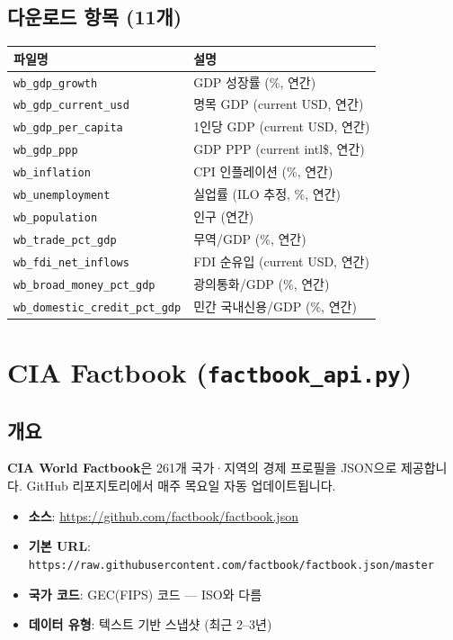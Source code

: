 \documentclass[11pt,a4paper]{article}
\newcommand{\code}[1]{\texttt{#1}}
\newcommand{\file}[1]{\texttt{\textcolor{string}{#1}}}
\begin{document}
\subsection{다운로드 항목 (11개)}

\begin{longtable}{l l}
\toprule
\textbf{파일명} & \textbf{설명} \\
\midrule
\endhead
\file{wb\_gdp\_growth}             & GDP 성장률 (\%, 연간) \\
\file{wb\_gdp\_current\_usd}       & 명목 GDP (current USD, 연간) \\
\file{wb\_gdp\_per\_capita}        & 1인당 GDP (current USD, 연간) \\
\file{wb\_gdp\_ppp}                & GDP PPP (current intl\$, 연간) \\
\file{wb\_inflation}               & CPI 인플레이션 (\%, 연간) \\
\file{wb\_unemployment}            & 실업률 (ILO 추정, \%, 연간) \\
\file{wb\_population}              & 인구 (연간) \\
\file{wb\_trade\_pct\_gdp}         & 무역/GDP (\%, 연간) \\
\file{wb\_fdi\_net\_inflows}       & FDI 순유입 (current USD, 연간) \\
\file{wb\_broad\_money\_pct\_gdp}  & 광의통화/GDP (\%, 연간) \\
\file{wb\_domestic\_credit\_pct\_gdp} & 민간 국내신용/GDP (\%, 연간) \\
\bottomrule
\end{longtable}


\section{CIA Factbook (\file{factbook\_api.py})}

\subsection{개요}

\textbf{CIA World Factbook}은 261개 국가·지역의 경제 프로필을 JSON으로 제공합니다.
GitHub 리포지토리에서 매주 목요일 자동 업데이트됩니다.

\begin{itemize}[leftmargin=2em]
    \item \textbf{소스}: \url{https://github.com/factbook/factbook.json}
    \item \textbf{기본 URL}: \code{https://raw.githubusercontent.com/factbook/factbook.json/master}
    \item \textbf{국가 코드}: GEC(FIPS) 코드 --- ISO와 다름
    \item \textbf{데이터 유형}: 텍스트 기반 스냅샷 (최근 2--3년)
\end{itemize}
\end{document}
